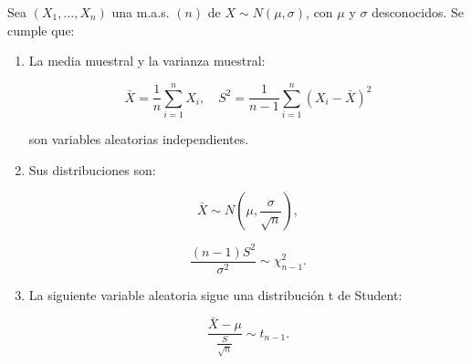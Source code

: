 \begin{teorema}[de Fisher]
	Sea $\left(X_{1}, \dots, X_{n}\right)$ una m.a.s. $(n)$ de $X \sim N(\mu, \sigma)$, con $\mu$ y $\sigma$ desconocidos. Se cumple que:

	\begin{enumerate}

		\item La media muestral y la varianza muestral:

		      \[
			      \bar{X} = \frac{1}{n} \sum_{i=1}^{n} X_{i}, \quad S^{2} = \frac{1}{n-1} \sum_{i=1}^{n} \left(X_{i} - \bar{X} \right)^{2}
		      \]

		      son variables aleatorias independientes.

		\item Sus distribuciones son:

		      \[
			      \bar{X} \sim N\left(\mu, \frac{\sigma}{\sqrt{n}}\right),
		      \]

		      \[
			      \frac{(n-1) S^{2}}{\sigma^{2}} \sim \chi_{n-1}^{2}.
		      \]

		\item La siguiente variable aleatoria sigue una distribución t de Student:

		      \[
			      \frac{\bar{X} - \mu}{\frac{S}{\sqrt{n}}} \sim t_{n-1}.
		      \]

	\end{enumerate}
\end{teorema}

